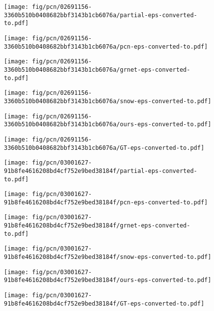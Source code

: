 \begin{figure*}[t]
	\begin{subfigure}{\sunit}
		\centering
		\texttt{[image: fig/pcn/02691156-3360b510b0408682bbf3143b1cb6076a/partial-eps-converted-to.pdf]}
	\end{subfigure}\hfill \begin{subfigure}{\sunit}
		\centering
		\texttt{[image: fig/pcn/02691156-3360b510b0408682bbf3143b1cb6076a/pcn-eps-converted-to.pdf]}
	\end{subfigure}\hfill \begin{subfigure}{\sunit}
		\centering
		\texttt{[image: fig/pcn/02691156-3360b510b0408682bbf3143b1cb6076a/grnet-eps-converted-to.pdf]}
	\end{subfigure}\hfill \begin{subfigure}{\sunit}
		\centering
		\texttt{[image: fig/pcn/02691156-3360b510b0408682bbf3143b1cb6076a/snow-eps-converted-to.pdf]}
	\end{subfigure}\hfill \begin{subfigure}{\sunit}
		\centering
		\texttt{[image: fig/pcn/02691156-3360b510b0408682bbf3143b1cb6076a/ours-eps-converted-to.pdf]}
	\end{subfigure}\hfill \begin{subfigure}{\sunit}
		\centering
		\texttt{[image: fig/pcn/02691156-3360b510b0408682bbf3143b1cb6076a/GT-eps-converted-to.pdf]}
	\end{subfigure}
	


	\begin{subfigure}{\sunit}
		\centering
		\texttt{[image: fig/pcn/03001627-91b8fe4616208bd4cf752e9bed38184f/partial-eps-converted-to.pdf]}
	\end{subfigure}\hfill \begin{subfigure}{\sunit}
		\centering
		\texttt{[image: fig/pcn/03001627-91b8fe4616208bd4cf752e9bed38184f/pcn-eps-converted-to.pdf]}
	\end{subfigure}\hfill \begin{subfigure}{\sunit}
		\centering
		\texttt{[image: fig/pcn/03001627-91b8fe4616208bd4cf752e9bed38184f/grnet-eps-converted-to.pdf]}
	\end{subfigure}\hfill \begin{subfigure}{\sunit}
		\centering
		\texttt{[image: fig/pcn/03001627-91b8fe4616208bd4cf752e9bed38184f/snow-eps-converted-to.pdf]}
	\end{subfigure}\hfill \begin{subfigure}{\sunit}
		\centering
		\texttt{[image: fig/pcn/03001627-91b8fe4616208bd4cf752e9bed38184f/ours-eps-converted-to.pdf]}
	\end{subfigure}\hfill \begin{subfigure}{\sunit}
		\centering
		\texttt{[image: fig/pcn/03001627-91b8fe4616208bd4cf752e9bed38184f/GT-eps-converted-to.pdf]}
	\end{subfigure}



\end{figure*}
